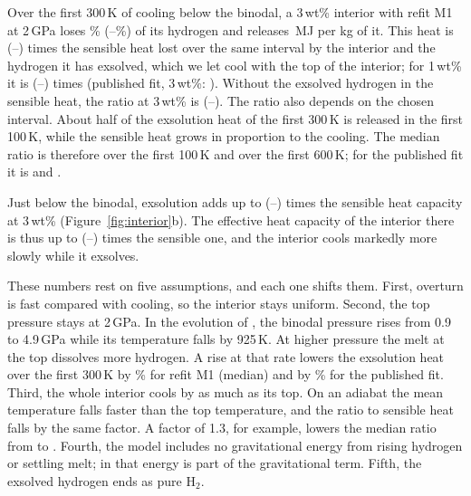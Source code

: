 Over the first 300\,K of cooling below the binodal, a 3\,wt\% interior with refit M1 at 2\,GPa
loses \intExsolvedThree{}\% (\intExsolvedThreeLo{}--\intExsolvedThreeHi{}\%) of its hydrogen
and releases \intPerKgThree{}\,MJ per kg of it. This heat is \intRatioThree{}
(\intRatioThreeLo{}--\intRatioThreeHi{}) times the sensible heat lost over the same interval by
the interior and the hydrogen it has exsolved, which we let cool with the top of the interior;
for 1\,wt\% it is \intRatioOne{} (\intRatioOneLo{}--\intRatioOneHi{}) times (published fit,
3\,wt\%: \intPubRatioThree{}). Without the exsolved hydrogen in the sensible heat, the ratio at
3\,wt\% is \intInteriorOnlyThree{} (\intInteriorOnlyThreeLo{}--\intInteriorOnlyThreeHi{}). The
ratio also depends on the chosen interval. About half of the exsolution heat of the first
300\,K is released in the first 100\,K, while the sensible heat grows in proportion to the
cooling. The median ratio is therefore \intRatioThreeHundredK{} over the first 100\,K and
\intRatioThreeSixHundredK{} over the first 600\,K; for the published fit it is
\intPubRatioThreeHundredK{} and \intPubRatioThreeSixHundredK{}.

Just below the binodal, exsolution adds up to \intGammaThree{}
(\intGammaThreeLo{}--\intGammaThreeHi{}) times the sensible heat capacity at 3\,wt\%
(Figure~\ref{fig:interior}b). The effective heat capacity of the interior there is thus up to
\intCeffThree{} (\intCeffThreeLo{}--\intCeffThreeHi{}) times the sensible one, and the interior
cools markedly more slowly while it exsolves.

These numbers rest on five assumptions, and each one shifts them. First, overturn is fast
compared with cooling, so the interior stays uniform. Second, the top pressure stays at
2\,GPa. In the evolution of \cite{rogers2025}, the binodal pressure rises from 0.9 to 4.9\,GPa
while its temperature falls by 925\,K. At higher pressure the melt at the top dissolves more
hydrogen. A rise at that rate lowers the exsolution heat over the first 300\,K by
\risePressMOne{}\% for refit M1 (median) and by \risePressPub{}\% for the published fit. Third,
the whole interior cools by as much as its top. On an adiabat the mean temperature falls faster
than the top temperature, and the ratio to sensible heat falls by the same factor. A factor of
1.3, for example, lowers the median ratio from \intRatioThree{} to \intRatioThreeAdiabat{}.
Fourth, the model includes no gravitational energy from rising hydrogen or settling melt; in
\cite{rogers2025} that energy is part of the gravitational term. Fifth, the exsolved hydrogen
ends as pure H$_2$.

